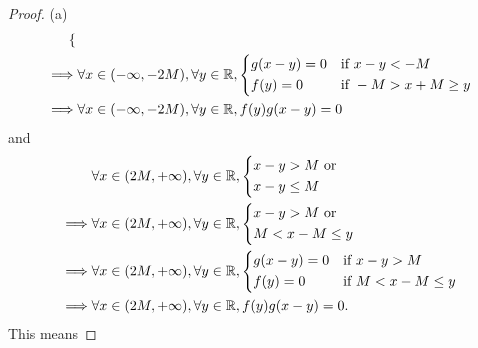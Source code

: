 \begin{proof}{(a)}
\begin{align*}
\begin{dcases}
                                                               \end{dcases}                      \\
    \implies & \forall x \in (-\infty, -2M), \forall y \in \mathbb{R}, \begin{dcases}
                                                                 g(x - y) = 0 & \text{if } x - y < -M        \\
                                                                 f(y) = 0     & \text{if } -M > x + M \geq y
                                                               \end{dcases} \\
    \implies & \forall x \in (-\infty, -2M), \forall y \in \mathbb{R}, f(y) g(x - y) = 0
  \end{align*}
  and
  \begin{align*}
             & \forall x \in (2M, +\infty), \forall y \in \mathbb{R}, \begin{dcases}
                                                                x - y > M \text{ or } \\
                                                                x - y \leq M
                                                              \end{dcases}                      \\
    \implies & \forall x \in (2M, +\infty), \forall y \in \mathbb{R}, \begin{dcases}
                                                                x - y > M \text{ or } \\
                                                                M < x - M \leq y
                                                              \end{dcases}                      \\
    \implies & \forall x \in (2M, +\infty), \forall y \in \mathbb{R}, \begin{dcases}
                                                                g(x - y) = 0 & \text{if } x - y > M        \\
                                                                f(y) = 0     & \text{if } M < x - M \leq y
                                                              \end{dcases} \\
    \implies & \forall x \in (2M, +\infty), \forall y \in \mathbb{R}, f(y) g(x - y) = 0.
  \end{align*}
  This means

\end{proof}
